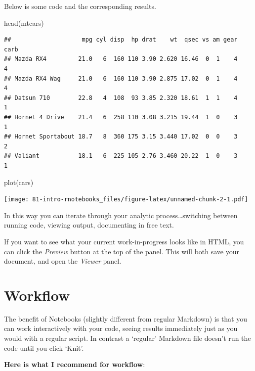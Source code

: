 \documentclass[
]{book}
\newenvironment{Shaded}{\begin{snugshade}}{\end{snugshade}}
\newcommand{\FunctionTok}[1]{\textcolor[rgb]{0.00,0.00,0.00}{#1}}
\newcommand{\NormalTok}[1]{#1}
\begin{document}
Below is some code and the corresponding results.

\begin{Shaded}
\begin{Highlighting}[]
\FunctionTok{head}\NormalTok{(mtcars)}
\end{Highlighting}
\end{Shaded}

\begin{verbatim}
##                    mpg cyl disp  hp drat    wt  qsec vs am gear carb
## Mazda RX4         21.0   6  160 110 3.90 2.620 16.46  0  1    4    4
## Mazda RX4 Wag     21.0   6  160 110 3.90 2.875 17.02  0  1    4    4
## Datsun 710        22.8   4  108  93 3.85 2.320 18.61  1  1    4    1
## Hornet 4 Drive    21.4   6  258 110 3.08 3.215 19.44  1  0    3    1
## Hornet Sportabout 18.7   8  360 175 3.15 3.440 17.02  0  0    3    2
## Valiant           18.1   6  225 105 2.76 3.460 20.22  1  0    3    1
\end{verbatim}

\begin{Shaded}
\begin{Highlighting}[]
\FunctionTok{plot}\NormalTok{(cars)}
\end{Highlighting}
\end{Shaded}

\texttt{[image: 81-intro-rnotebooks\_files/figure-latex/unnamed-chunk-2-1.pdf]}

In this way you can iterate through your analytic process\ldots switching between running code, viewing output, documenting in free text.

If you want to see what your current work-in-progress looks like in HTML, you can click the \emph{Preview} button at the top of the panel. This will both save your document, and open the \emph{Viewer} panel.

\hypertarget{workflow}{%
\section{Workflow}\label{workflow}}

The benefit of Notebooks (slightly different from regular Markdown) is that you can work interactively with your code, seeing results immediately just as you would with a regular script. In contrast a `regular' Markdown file doesn't run the code until you click `Knit'.

\textbf{Here is what I recommend for workflow}:
\end{document}
